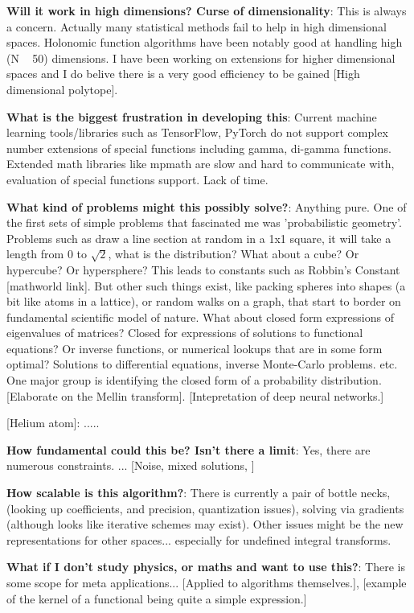 \documentclass{article}
\begin{document}
\textbf{Will it work in high dimensions? Curse of dimensionality}: This is always a concern. Actually many statistical methods fail to help in high dimensional spaces. Holonomic function algorithms have been notably good at handling high (N ~ 50) dimensions. I have been working on extensions for higher dimensional spaces and I do belive there is a very good efficiency to be gained [High dimensional polytope].

\textbf{What is the biggest frustration in developing this}: Current machine learning tools/libraries such as TensorFlow, PyTorch do not support complex number extensions of special functions including gamma, di-gamma functions. Extended math libraries like mpmath are slow and hard to communicate with, evaluation of special functions support. Lack of time.

\textbf{What kind of problems might this possibly solve?}: Anything pure. One of the first sets of simple problems that fascinated me was 'probabilistic geometry'. Problems such as draw a line section at random in a 1x1 square, it will take a length from 0 to $\sqrt{2}$, what is the distribution? What about a cube? Or hypercube? Or hypersphere? This leads to constants such as Robbin's Constant [mathworld link]. But other such things exist, like packing spheres into shapes (a bit like atoms in a lattice), or random walks on a graph, that start to border on fundamental scientific model of nature. What about closed form expressions of eigenvalues of matrices? Closed for expressions of solutions to functional equations? Or inverse functions, or numerical lookups that are in some form optimal? Solutions to differential equations, inverse Monte-Carlo problems. etc. One major group is identifying the closed form of a probability distribution.  [Elaborate on the Mellin transform]. [Intepretation of deep neural networks.]

[Helium atom]: .....

\textbf{How fundamental could this be? Isn't there a limit}: Yes, there are numerous constraints. ... [Noise, mixed solutions, ]

\textbf{How scalable is this algorithm?}: There is currently a pair of bottle necks, (looking up coefficients, and precision, quantization issues), solving via gradients (although looks like iterative schemes may exist). Other issues might be the new representations for other spaces... especially for undefined integral transforms. 

\textbf{What if I don't study physics, or maths and want to use this?}: There is some scope for meta applications... [Applied to algorithms themselves.], [example of the kernel of a functional being quite a simple expression.]
\end{document}
